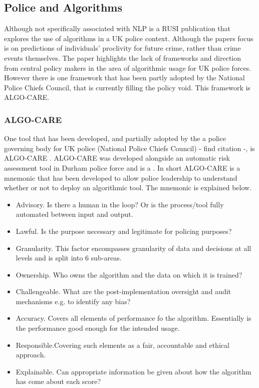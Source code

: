 \subsection{Police and Algorithms}

Although not specifically associated with NLP  \textcite{babuta2018machine} is a RUSI publication that explores the use of algorithms in a UK police context. Although the papers focus is on predictions of individuals' proclivity for future crime, rather than crime events themselves. The paper highlights the lack of frameworks and direction from central policy makers in the area of algorithmic usage for UK police forces. However there is one framework that has been partly adopted by the National Police Chiefs Council, that is currently filling the policy void. This framework is ALGO-CARE.

\subsubsection{ALGO-CARE}

One tool that has been developed, and partially adopted by the a police governing body for UK police (National Police Chiefs Council) - find citation -, is ALGO-CARE  \parencite{oswald2018algorithmic} . ALGO-CARE was developed alongside an automatic risk assessment tool in Durham police force and is a  \parencite{oswald2018algorithmic}. In short ALGO-CARE is a mnemonic that has been developed to allow police leadership to understand whether or not to deploy an algorithmic tool. The mnemonic is explained below.


\begin{itemize}
\item{Advisory.} Is there a human in the loop? Or is the process/tool fully automated between input and output. 
\item{Lawful.} Is the purpose necessary and legitimate for policing purposes?
\item{Granularity.} This factor encompasses granularity of data and decisions at all levels and is split into 6 sub-areas.
\item{Ownership.} Who owns the algorithm and the data on which it is trained?
\item{Challengeable.} What are the post-implementation oversight and audit mechanisms e.g. to identify any bias?
\item{Accuracy.} Covers all elements of performance fo the algorithm. Essentially is the performance good enough for the intended usage.
\item{Responsible.}Covering such elements as a fair, accountable and ethical approach.
\item{Explainable.} Can appropriate information be given about how the algorithm has come about each score?
\end{itemize}

